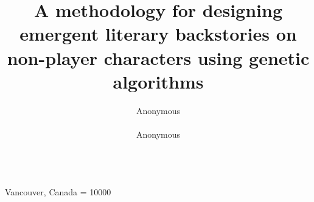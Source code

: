 \documentclass{sig-alternate}
\begin{document}
%
 {Vancouver, Canada}
    \widowpenalty = 10000



\title{A methodology for designing emergent literary backstories on non-player characters using genetic algorithms}



 \author{
 \alignauthor
 Anonymous\\
        \\
 \alignauthor
 Anonymous\\
 \\
 }


\maketitle


\end{document}
